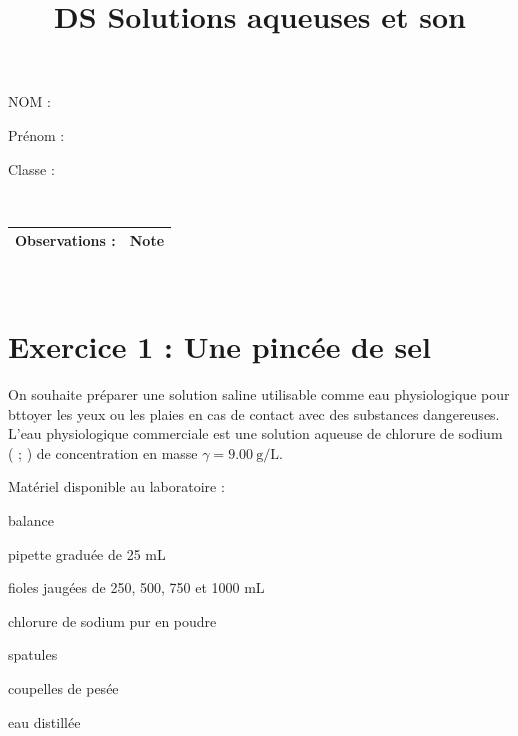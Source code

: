\documentclass[a4paper,12pt]{article}
\begin{document}
\title{DS Solutions aqueuses et son}
\begin{minipage}{.4\linewidth}
    NOM :
\end{minipage}
\begin{minipage}{.4\linewidth}
    Prénom :
\end{minipage}
\begin{minipage}{.2\linewidth}
    Classe :
\end{minipage}\\

\begin{tabular}{p{.7\linewidth}|p{.22\linewidth}}
    \hline
    Observations : \vspace{3em}& Note \\
    \hline
\end{tabular}\\
\vspace{-2em}
\section*{Exercice 1 : Une pincée de sel}
\begin{minipage}{.48\linewidth}
    On souhaite préparer une solution saline utilisable comme eau physiologique pour bttoyer les yeux ou les plaies en cas de contact avec des substances dangereuses.\\
L'eau physiologique commerciale est une solution aqueuse de chlorure de sodium ( ; ) de concentration en masse $\gamma = \SI{9,00}{\gram\per\liter}$.
\end{minipage}\hspace{.02\linewidth}
\begin{minipage}{.5\linewidth}
    Matériel disponible au laboratoire :
    \begin{itemize*}
        \item balance
        \item pipette graduée de 25 mL
        \item fioles jaugées de 250, 500, 750 et 1000 mL
        \item chlorure de sodium pur en poudre
        \item spatules
        \item coupelles de pesée
        \item eau distillée
    \end{itemize*}
\end{minipage}
\end{document}
